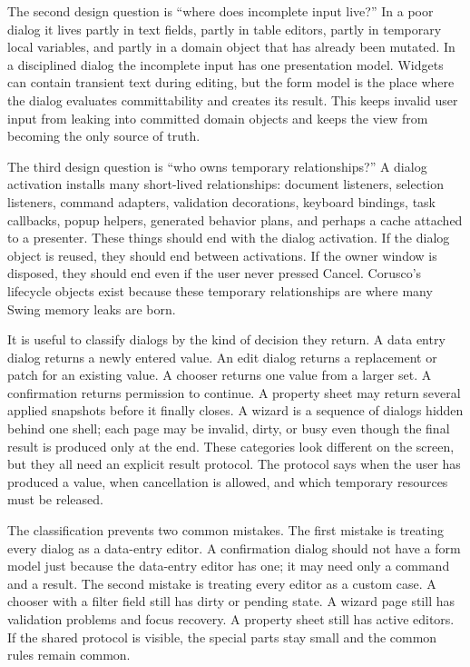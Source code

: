 The second design question is ``where does incomplete input live?'' In a poor
dialog it lives partly in text fields, partly in table editors, partly in
temporary local variables, and partly in a domain object that has already been
mutated. In a disciplined dialog the incomplete input has one presentation
model. Widgets can contain transient text during editing, but the form model is
the place where the dialog evaluates committability and creates its result.
This keeps invalid user input from leaking into committed domain objects and
keeps the view from becoming the only source of truth.

The third design question is ``who owns temporary relationships?'' A dialog
activation installs many short-lived relationships: document listeners,
selection listeners, command adapters, validation decorations, keyboard
bindings, task callbacks, popup helpers, generated behavior plans, and perhaps
a cache attached to a presenter. These things should end with the dialog
activation. If the dialog object is reused, they should end between
activations. If the owner window is disposed, they should end even if the user
never pressed Cancel. Corusco's lifecycle objects exist because these temporary
relationships are where many Swing memory leaks are born.

It is useful to classify dialogs by the kind of decision they return. A data
entry dialog returns a newly entered value. An edit dialog returns a replacement
or patch for an existing value. A chooser returns one value from a larger set. A
confirmation returns permission to continue. A property sheet may return
several applied snapshots before it finally closes. A wizard is a sequence of
dialogs hidden behind one shell; each page may be invalid, dirty, or busy even
though the final result is produced only at the end. These categories look
different on the screen, but they all need an explicit result protocol. The
protocol says when the user has produced a value, when cancellation is allowed,
and which temporary resources must be released.

The classification prevents two common mistakes. The first mistake is treating
every dialog as a data-entry editor. A confirmation dialog should not have a
form model just because the data-entry editor has one; it may need only a
command and a result. The second mistake is treating every editor as a custom
case. A chooser with a filter field still has dirty or pending state. A wizard
page still has validation problems and focus recovery. A property sheet still
has active editors. If the shared protocol is visible, the special parts stay
small and the common rules remain common.

